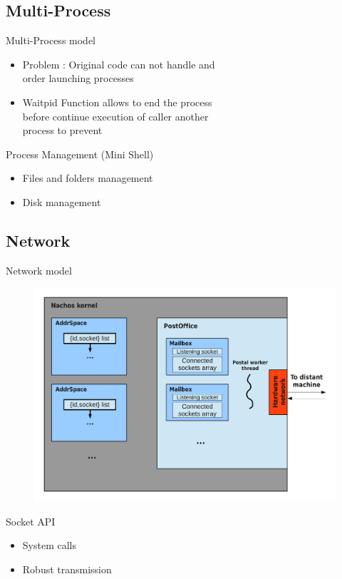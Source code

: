 \documentclass{beamer}
\begin{document}
\subsection{Multi-Process}
\begin{frame}{Multi-Process model}
  \begin{itemize}
	\item Problem : Original code can not handle and
	\\order launching processes
    \item Waitpid Function allows to end the process 
    \\before continue execution of caller another
    \\process to prevent
  \end{itemize}
\end{frame}

\begin{frame}{Process Management (Mini Shell)}
  \begin{itemize}
    \item Files and folders management
    \item Disk management
  \end{itemize}
\end{frame}

\subsection{Network}
\begin{frame}{Network model}
    \begin{figure}[ht]
		\includegraphics[width=0.7\linewidth]{Networkcolored.pdf}
    \end{figure}
\end{frame}

\begin{frame}{Socket API}
  \begin{itemize}
    \item System calls  
    \item Robust transmission
  \end{itemize}
\end{frame}
\end{document}

